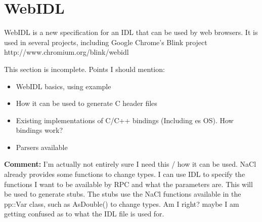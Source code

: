 
\section{WebIDL}
WebIDL is a new specification for an IDL that can be used by web browsers. It is used in several projects, including Google Chrome's Blink project http://www.chromium.org/blink/webidl 

This section is incomplete. Points I should mention:
\begin{itemize}
	\item WebIDL basics, using example
	\item How it can be used to generate C header files
	\item Existing implementations of C/C++ bindings (Including es OS). How bindings work?
	\item Parsers available
\end{itemize}

\textbf{Comment: } I'm actually not entirely sure I need this / how it can be used. NaCl already provides some functions to change types. I can use IDL to specify the functions I want to be available by RPC and what the parameters are. This will be used to generate stubs. The stubs use the NaCl functions available in the pp::Var class, such as AsDouble() to change types. Am I right? maybe I am getting confused as to what the IDL file is used for.
